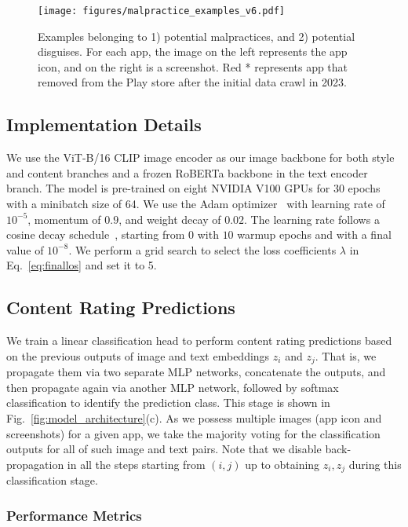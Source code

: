 \begin{figure*}[ht]
    \centering
    \texttt{[image: figures/malpractice\_examples\_v6.pdf]}
    \caption{Examples belonging to 1) potential malpractices, and 2) potential disguises. For each app, the image on the left represents the app icon, and on the right is a screenshot. Red * represents app that removed from the Play store after the initial data crawl in 2023.}
    \label{fig:malpractices}
\end{figure*}

\subsection{Implementation Details}
\label{sec:ImplementationDetails}
We use the ViT-B/16 CLIP image encoder as our image backbone for both style and content branches and a frozen RoBERTa backbone in the text encoder branch. The model is pre-trained on eight NVIDIA V100 GPUs for 30 epochs with a minibatch size of 64. We use the Adam optimizer~\cite{kingma2014adam} with learning rate of $10^{-5}$, momentum of $0.9$, and weight decay of $0.02$. The learning rate follows a cosine decay schedule~\cite{loshchilov2016sgdr}, starting from 0 with $10$ warmup epochs and with a final value of $10^{-8}$. We perform a grid search to select the loss coefficients $\lambda$ in Eq.~\ref{eq:finallos} and set it to 5.

\subsection{Content Rating Predictions}
\label{subsec: content rating prediction}

We train a linear classification head to perform content rating predictions based on the previous outputs of image and text embeddings $z_i$ and $z_j$. That is, we propagate them via two separate MLP networks, concatenate the outputs, and then propagate again via another MLP network, followed by softmax classification to identify the prediction class. This stage is shown in Fig.~\ref{fig:model_architecture}(c). As we possess multiple images (app icon and screenshots) for a given app, we take the majority voting for the classification outputs for all of such image and text pairs. Note that we disable back-propagation in all the steps starting from $(i,j)$ up to obtaining $z_i,z_j$ during this classification stage. 

\subsubsection{Performance Metrics}

